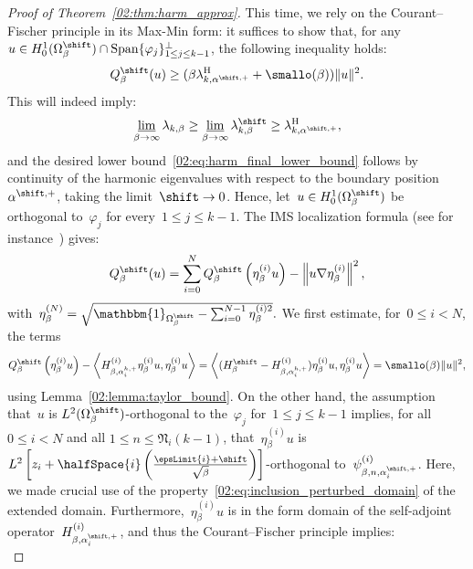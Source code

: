 \begin{proof}[Proof of Theorem~\ref{02:thm:harm_approx}]
        This time, we rely on the Courant--Fischer principle in its Max-Min form: it suffices to show that, for any~$u \in H_0^1(\Omega_\beta^\shift)\cap\mathrm{Span}\{\varphi_j\}_{ 1\leq j \leq k-1}^\perp$, the following inequality holds:
       ~$$ Q^\shift_\beta(u) \geq (\beta\lambda_{k,\alpha^{\shift,+}}^{\mathrm{H}} + \smallo(\beta))\|u\|^2.$$
        This will indeed imply:
        \[\underset{\beta\to\infty}{\underline\lim}\,\lambda_{k,\beta}\geq\underset{\beta\to\infty}{\underline\lim}\,\lambda^\shift_{k,\beta}\geq \lambda_{k,\alpha^{\shift,+}}^{\mathrm{H}},\]
        and the desired lower bound~\eqref{02:eq:harm_final_lower_bound} follows by continuity of the harmonic eigenvalues with respect to the boundary position~$\alpha^{\shift,+}$, taking the limit~$\shift\to 0$.
        Hence, let~$u\in H_0^1(\Omega_\beta^\shift)$ be orthogonal to~$\varphi_j$ for every~$1\leq j \leq k-1$. The IMS localization formula (see for instance~\cite[Chapter 3]{CFKS87}) gives:
        \begin{equation}
        \label{02:eq:ims_formula}
        Q^\shift_\beta(u) = \sum_{i=0}^{N} Q^\shift_\beta\left(\eta_\beta^{(i)}u\right) - \left\|u\nabla \eta_\beta^{(i)}\right\|^2,
        \end{equation}
        with~$\eta_\beta^{(N)} = \sqrt{\mathbbm{1}_{\Omega_\beta^\shift}-\sum_{i=0}^{N-1}\eta_\beta^{(i)2}}.$
        We first estimate, for~$0\leq i < N$, the terms
        \begin{equation}
            Q_\beta^\shift\left(\eta_\beta^{(i)}u\right)-\left\langle H_{\beta,\alpha^{h,+}_i}^{(i)}\eta_\beta^{(i)}u,\eta_\beta^{(i)}u\right\rangle = \left\langle (H_\beta^\shift-H_{\beta,\alpha_i^{h,+}}^{(i)})\eta_\beta^{(i)}u,\eta_\beta^{(i)}u\right\rangle = \smallo(\beta)\|u\|^2,
        \end{equation}
        using Lemma~\ref{02:lemma:taylor_bound}.
        On the other hand, the assumption that~$u$ is $L^2(\Omega_\beta^\shift)$-orthogonal to the~$\varphi_j$ for~$1\leq j \leq k-1$ implies, for all $0\leq i<N$ and all $1\leq n\leq\mathfrak N_i(k-1)$, that~$\eta_\beta^{(i)}u$ is $L^2\left[z_{i} + \halfSpace{i}\left(\frac{\epsLimit{i}+\shift}{\sqrt\beta}\right)\right]$-orthogonal to~$\psi_{\beta,n,\alpha_{i}^{\shift,+}}^{(i)}$.
        Here, we made crucial use of the property~\eqref{02:eq:inclusion_perturbed_domain} of the extended domain.
        Furthermore,~$\eta_\beta^{(i)}u$ is in the form domain of the self-adjoint operator~$H_{\beta,\alpha^{\shift,+}_{i}}^{(i)}$, and thus the Courant--Fischer principle implies:
        \begin{equation}

\end{equation}
\end{proof}
